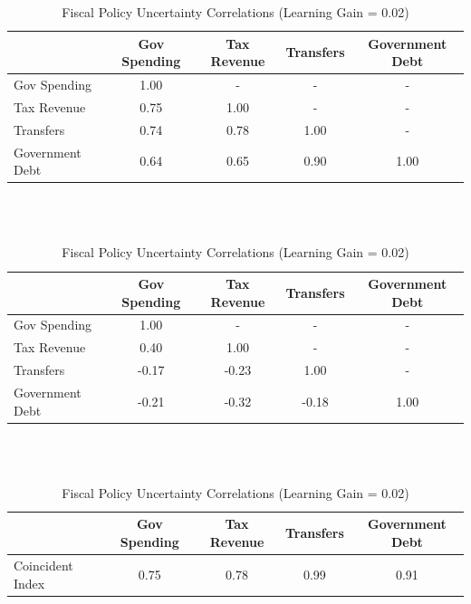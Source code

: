 \documentclass[11pt]{article}
\begin{document}
\begin{table}[t]\caption{Fiscal Policy Uncertainty Correlations (Learning Gain = 0.02)}\label{tb:fpucorrel0.02}
\begin{center}
\begin{tabular}{l|cccc}
 & Gov Spending & Tax Revenue & Transfers & Government Debt \\ \hline
Gov Spending & 1.00 & - & - & - \\
Tax Revenue & 0.75 & 1.00 & - & - \\
Transfers & 0.74 & 0.78 & 1.00 & - \\
Government Debt & 0.64 & 0.65 & 0.90 & 1.00 \\ \hline
\end{tabular}
\ \\ \ \\

\begin{tabular}{l|cccc}
 & Gov Spending & Tax Revenue & Transfers & Government Debt \\ \hline
Gov Spending & 1.00 & - & - & - \\
Tax Revenue & 0.40 & 1.00 & - & - \\
Transfers & -0.17 & -0.23 & 1.00 & - \\
Government Debt & -0.21 & -0.32 & -0.18 & 1.00 \\ \hline
\end{tabular}

\ \\ \ \\

\begin{tabular}{l|cccc}
 & Gov Spending & Tax Revenue & Transfers & Government Debt \\ \hline
Coincident Index~ & 0.75 & 0.78 & 0.99 & 0.91 \\ \hline
\end{tabular}

\end{center}
\end{table}
\end{document}
